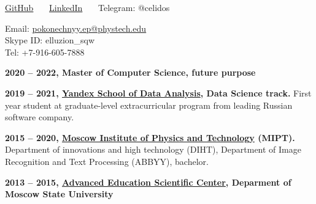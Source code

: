 \documentclass[a4paper,12pt]{memoir} %
\begin{document}
	\begin{minipage}[t]{0.5\textwidth}
		\href{https://github.com/celidos}{GitHub} ~~~\href{https://www.linkedin.com/in/eduard-pokonechnyy-855415196/}{LinkedIn} ~~~Telegram: @celidos \\
	\end{minipage}
	\begin{minipage}[t]{0.5\textwidth}
		\begin{flushright}
			Email: \href{mailto:pokonechnyy.ep@phystech.edu}{pokonechnyy.ep@phystech.edu}\\
			Skype ID: elluzion\_sqw\\
			Tel: +7-916-605-7888
		\end{flushright}
	\end{minipage}
	
	
	\Sep
	
	
	\textbf{2020 -- 2022, Master of Computer Science, future purpose}
	
	\SepSep
	\textbf{2019 -- 2021, \href{https://yandexdataschool.com/edu-process/program/data-science}{Yandex School of Data Analysis}, Data Science track.}
	First year student at graduate-level extracurricular program from leading Russian software company.
	
	\SepSep
	\textbf{2015 -- 2020, \href{https://mipt.ru/english/}{Moscow Institute of Physics and Technology} (MIPT).}{
		Department of innovations and high technology (DIHT), Department of Image Recognition and Text Processing (ABBYY), bachelor.
	}
	
	\SepSep
	\textbf{2013 -- 2015, \href{https://internat.msu.ru/en/}{Advanced Education Scientific Center}, Deparment of Moscow State University}
	\Sep
	
	
\end{document}
